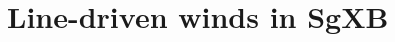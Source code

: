 \documentclass[letter]{aa}
\makeatletter
\newcommand*{\ns}{NS\@\xspace}
\makeatother
\begin{document}
\section{Line-driven winds in SgXB}
\label{sec:}

\end{document}
